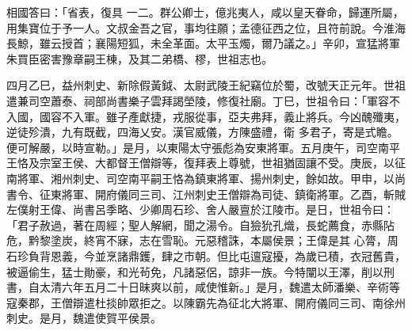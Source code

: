\begin{pinyinscope}
 相國答曰：「省表，復具
 一二。群公卿士，億兆夷人，咸以皇天眷命，歸運所屬，用集寶位于予一人。文叔金吾之官，事均往願；孟德征西之位，且符前說。今淮海長鯨，雖云授首；襄陽短狐，未全革面。太平玉燭，爾乃議之。」辛卯，宣猛將軍朱買臣密害豫章嗣王棟，及其二弟橋、樛，世祖志也。



 四月乙巳，益州刺史、新除假黃鉞、太尉武陵王紀竊位於蜀，改號天正元年。世祖遣兼司空蕭泰、祠部尚書樂子雲拜謁塋陵，修復社廟。丁巳，世祖令曰：「軍容不入國，國容不入軍。雖子產獻捷，戎服從事，亞夫弗拜，義止將兵。今凶醜殲夷，逆徒殄潰，九有既截，四海乂安。漢官威儀，方陳盛禮，衛
 多君子，寄是式瞻。便可解嚴，以時宣勒。」是月，以東陽太守張彪為安東將軍。五月庚午，司空南平王恪及宗室王侯、大都督王僧辯等，復拜表上尊號，世祖猶固讓不受。庚辰，以征南將軍、湘州刺史、司空南平嗣王恪為鎮東將軍、揚州刺史，餘如故。甲申，以尚書令、征東將軍、開府儀同三司、江州刺史王僧辯為司徒、鎮衛將軍。乙酉，斬賊左僕射王偉、尚書呂季略、少卿周石珍、舍人嚴亶於江陵市。是日，世祖令曰：「君子赦過，著在周經；聖人解網，聞之湯令。自獫狁孔熾，長蛇薦食，赤縣阽危，黔黎塗炭，終宵不寐，志在雪恥。元惡稽誅，本屬侯景；王偉是其
 心膂，周石珍負背恩義，今並烹諸鼎鑊，肆之市朝。但比屯邅寇擾，為歲已積，衣冠舊貴，被逼偷生，猛士勛豪，和光茍免，凡諸惡侶，諒非一族。今特闡以王澤，削以刑書，自太清六年五月二十日昧爽以前，咸使惟新。」是月，魏遣太師潘樂、辛術等寇秦郡，王僧辯遣杜掞帥眾拒之。以陳霸先為征北大將軍、開府儀同三司、南徐州刺史。是月，魏遣使賀平侯景。




\end{pinyinscope}
